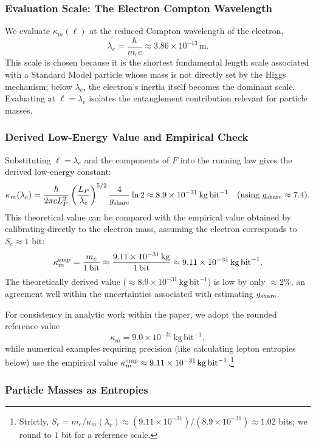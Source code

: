 \documentclass[11pt]{article}
\begin{document}
\subsubsection{Evaluation Scale: The Electron Compton Wavelength}

We evaluate $\kappa_m(\ell)$ at the reduced Compton wavelength of the electron,
$$ \lambda_e = \frac{\hbar}{m_e c} \approx 3.86 \times 10^{-13}\,\mathrm{m}. $$
This scale is chosen because it is the shortest fundamental length scale associated with a Standard Model particle whose mass is not directly set by the Higgs mechanism; below $\lambda_e$, the electron's inertia itself becomes the dominant scale. Evaluating at $\ell = \lambda_e$ isolates the entanglement contribution relevant for particle masses.

\subsubsection{Derived Low-Energy Value and Empirical Check}

Substituting $\ell = \lambda_e$ and the components of $F$ into the running law gives the derived low-energy constant:
$$ \kappa_m(\lambda_e) = \frac{\hbar}{2\pi c L_P^2} \left(\frac{L_P}{\lambda_e}\right)^{5/2} \frac{4}{g_{\rm share}} \ln 2 \approx 8.9 \times 10^{-31}\,\mathrm{kg\,bit}^{-1} \quad (\text{using } g_{\rm share} \approx 7.4). $$
This theoretical value can be compared with the empirical value obtained by calibrating directly to the electron mass, assuming the electron corresponds to $S_e \approx 1$ bit:
$$ \kappa_m^{\rm emp} = \frac{m_e}{1\,\mathrm{bit}} \approx \frac{9.11 \times 10^{-31}\,\mathrm{kg}}{1\,\mathrm{bit}} \approx 9.11 \times 10^{-31}\,\mathrm{kg\,bit}^{-1}. $$
The theoretically derived value ($\approx 8.9 \times 10^{-31}\,\mathrm{kg\,bit}^{-1}$) is low by only $\approx 2\%$, an agreement well within the uncertainties associated with estimating $g_{\rm share}$.

For consistency in analytic work within the paper, we adopt the rounded reference value
$$ \kappa_m = 9.0 \times 10^{-31}\,\mathrm{kg\,bit}^{-1}, $$
while numerical examples requiring precision (like calculating lepton entropies below) use the empirical value $\kappa_m^{\rm emp} \approx 9.11 \times 10^{-31}\,\mathrm{kg\,bit}^{-1}$.\footnote{Strictly, $S_e = m_e / \kappa_m(\lambda_e) \approx (9.11 \times 10^{-31}) / (8.9 \times 10^{-31}) \approx 1.02$ bits; we round to $1$ bit for a reference scale.}

\subsubsection{Particle Masses as Entropies}
\end{document}
